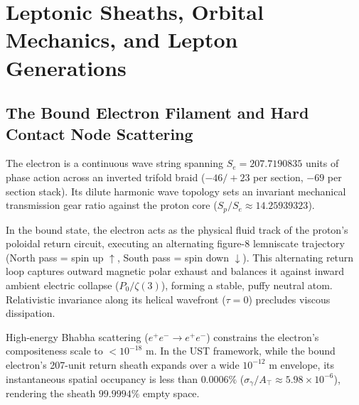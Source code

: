 \documentclass[11pt,a4paper]{article}
\begin{document}
	\section{Leptonic Sheaths, Orbital Mechanics, and Lepton Generations}
	
	\subsection{The Bound Electron Filament and Hard Contact Node Scattering}
	The electron is a continuous wave string spanning $S_e = 207.7190835$ units of phase action across an inverted trifold braid ($-46/+23$ per section, $-69$ per section stack). Its dilute harmonic wave topology sets an invariant mechanical transmission gear ratio against the proton core ($S_p / S_e \approx 14.25939323$).
	
	In the bound state, the electron acts as the physical fluid track of the proton's poloidal return circuit, executing an alternating figure-8 lemniscate trajectory (North pass = spin up $\uparrow$, South pass = spin down $\downarrow$). This alternating return loop captures outward magnetic polar exhaust and balances it against inward ambient electric collapse ($P_0 / \zeta(3)$), forming a stable, puffy neutral atom. Relativistic invariance along its helical wavefront ($\tau = 0$) precludes viscous dissipation.
	
	High-energy Bhabha scattering ($e^+e^- \to e^+e^-$) constrains the electron's compositeness scale to $< 10^{-18}\text{ m}$. In the UST framework, while the bound electron's 207-unit return sheath expands over a wide $10^{-12}\text{ m}$ envelope, its instantaneous spatial occupancy is less than $0.0006\%$ ($\sigma_\gamma / A_{\top} \approx 5.98 \times 10^{-6}$), rendering the sheath $99.9994\%$ empty space.
	
\end{document}
